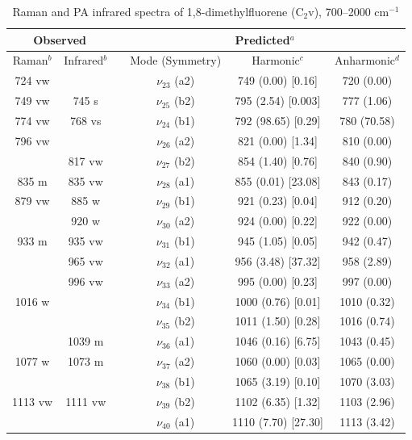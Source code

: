    \begin{table}[H]
   	\caption{Raman and PA infrared spectra of 1,8-dimethylfluorene (C$_{2}$v), 700–2000 cm$^{-1}$}
   	\begin{center}
   		\begin{tabular}{c c c c c c}
   			\hline
   			\multicolumn{ 2}{c}{Observed} & \multicolumn{1}{c}{} & \multicolumn{ 3}{c}{Predicted$^{a}$} \\ \hline
   			Raman$^{b}$ & \multicolumn{1}{c}{Infrared$^{b}$} &  & \multicolumn{1}{c}{Mode (Symmetry)} & \multicolumn{1}{c}{Harmonic$^{c}$} & Anharmonic$^{d}$ \\ \hline
724 vw &  &  & $\nu_{23}$ (a2) & 749 (0.00) [0.16] & 720 (0.00) \\ 
749 vw & 745 s &  & $\nu_{25}$ (b2) & 795 (2.54) [0.003] & 777 (1.06) \\ 
774 vw & 768 vs &  & $\nu_{24}$ (b1) & 792 (98.65) [0.29] & 780 (70.58) \\ 
796 vw &  &  & $\nu_{26}$ (a2) & 821 (0.00) [1.34] & 810 (0.00) \\ 
& 817 vw &  & $\nu_{27}$ (b2) & 854 (1.40) [0.76] & 840 (0.90) \\ 
835 m & 835 vw &  & $\nu_{28}$ (a1) & 855 (0.01) [23.08] & 843 (0.17) \\ 
879 vw & 885 w &  & $\nu_{29}$ (b1) & 921 (0.23) [0.04] & 912 (0.20) \\ 
 & 920 w &  & $\nu_{30}$ (a2) & 924 (0.00) [0.22] & 922 (0.00) \\ 
 933 m & 935 vw &  & $\nu_{31}$ (b1) & 945 (1.05) [0.05] & 942 (0.47) \\ 
 & 965 vw &  & $\nu_{32}$ (a1) & 956 (3.48) [37.32] & 958 (2.89) \\ 
 & 996 vw &  & $\nu_{33}$ (a2) & 995 (0.00) [0.23] & 997 (0.00) \\ 
 1016 w &  &  & $\nu_{34}$ (b1) & 1000 (0.76) [0.01] & 1010 (0.32) \\ 
 &  &  &  $\nu_{35}$ (b2) & 1011 (1.50) [0.28] & 1016 (0.74) \\ 
 & 1039 m &  &   $\nu_{36}$ (a1) & 1046 (0.16) [6.75] & 1043 (0.45) \\ 
 1077 w & 1073 m &  &   $\nu_{37}$ (a2) & 1060 (0.00) [0.03] & 1065 (0.00) \\ 
 &  &  &   $\nu_{38}$ (b1) & 1065 (3.19) [0.10] & 1070 (3.03) \\ 
 1113 vw & 1111 vw &  & $\nu_{39}$ (b2) & 1102 (6.35) [1.32] & 1103 (2.96) \\ 
 &  &  & $\nu_{40}$ (a1) & 1110 (7.70) [27.30] & 1113 (3.42) \\ 

\end{tabular}
\end{center}
\end{table}
